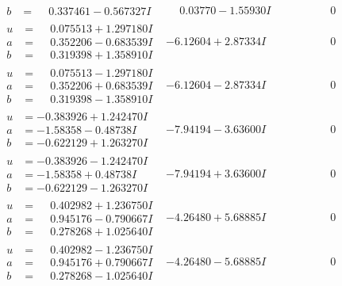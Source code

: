 \documentclass[1p]{elsarticle_modified}
\theoremstyle{definition}
\begin{document}
$$\begin{array}{c|c|c}
\begin{aligned}
b &= \phantom{-}0.337461 - 0.567327 I\end{aligned}
 & \phantom{-}0.03770 - 1.55930 I & \phantom{-0.000000 } 0 \\ \hline\begin{aligned}
u &= \phantom{-}0.075513 + 1.297180 I \\
a &= \phantom{-}0.352206 - 0.683539 I \\
b &= \phantom{-}0.319398 + 1.358910 I\end{aligned}
 & -6.12604 + 2.87334 I & \phantom{-0.000000 } 0 \\ \hline\begin{aligned}
u &= \phantom{-}0.075513 - 1.297180 I \\
a &= \phantom{-}0.352206 + 0.683539 I \\
b &= \phantom{-}0.319398 - 1.358910 I\end{aligned}
 & -6.12604 - 2.87334 I & \phantom{-0.000000 } 0 \\ \hline\begin{aligned}
u &= -0.383926 + 1.242470 I \\
a &= -1.58358 - 0.48738 I \\
b &= -0.622129 + 1.263270 I\end{aligned}
 & -7.94194 - 3.63600 I & \phantom{-0.000000 } 0 \\ \hline\begin{aligned}
u &= -0.383926 - 1.242470 I \\
a &= -1.58358 + 0.48738 I \\
b &= -0.622129 - 1.263270 I\end{aligned}
 & -7.94194 + 3.63600 I & \phantom{-0.000000 } 0 \\ \hline\begin{aligned}
u &= \phantom{-}0.402982 + 1.236750 I \\
a &= \phantom{-}0.945176 - 0.790667 I \\
b &= \phantom{-}0.278268 + 1.025640 I\end{aligned}
 & -4.26480 + 5.68885 I & \phantom{-0.000000 } 0 \\ \hline\begin{aligned}
u &= \phantom{-}0.402982 - 1.236750 I \\
a &= \phantom{-}0.945176 + 0.790667 I \\
b &= \phantom{-}0.278268 - 1.025640 I\end{aligned}
 & -4.26480 - 5.68885 I & \phantom{-0.000000 } 0 \\ \hline\begin{aligned}

\end{aligned}
\end{array}$$
\end{document}
